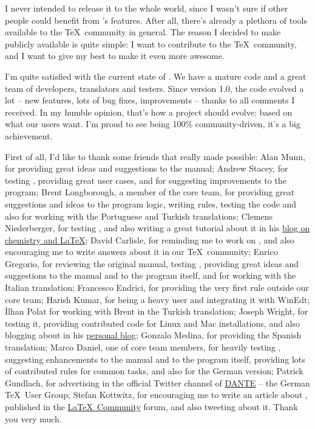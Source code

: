 \documentclass[a4paper,twoside,12pt]{memoir}
\begin{document}
I never intended to release it to the whole world, since I wasn't sure if other people could benefit from \arara's features. After all, there's already a plethora of tools available to the \TeX\ community in general. The reason I decided to make \arara publicly available is quite simple: I want to contribute to the \TeX\ community, and I want to give my best to make it even more awesome.

I'm quite satisfied with the current state of \arara. We have a mature code and a great team of developers, translators and testers. Since version 1.0, the code evolved a lot -- new features, lots of bug fixes, improvements -- thanks to all comments I received. In my humble opinion, that's how a project should evolve: based on what our users want. I'm proud to see \arara being 100\% community-driven, it's a big achievement.

First of all, I'd like to thank some friends that really made \arara possible: Alan Munn, for providing great ideas and suggestions to the manual; Andrew Stacey, for testing \arara, providing great user cases, and for suggesting improvements to the program; Brent Longborough, a member of the core team, for providing great suggestions and ideas to the program logic, writing rules, testing the code and also for working with the Portuguese and Turkish translations; Clemens Niederberger, for testing \arara, and also writing a great tutorial about it in his \href{http://www.mychemistry.eu/2012/06/arara-automate-latex-birds-music/}{blog on chemistry and \LaTeX}; David Carlisle, for reminding me to work on \arara, and also encouraging me to write answers about it in our \TeX\ community; Enrico Gregorio, for reviewing the original manual, testing \arara, providing great ideas and suggestions to the manual and to the program itself, and for working with the Italian translation; Francesco Endrici, for providing the very first \arara rule outside our core team; Harish Kumar, for being a heavy \arara user and integrating it with WinEdt; \.Ilhan Polat for working with Brent in the Turkish translation; Joseph Wright, for testing it, providing contributed code for Linux and Mac installations, and also blogging about \arara in his 
     \href{http://www.texdev.net}{personal blog}; Gonzalo Medina, for providing the Spanish translation; Marco Daniel, one of core team members, for heavily testing \arara, suggesting enhancements to the manual and to the program itself, providing lots of contributed rules for common tasks, and also for the German version; Patrick Gundlach, for advertising \arara in the official Twitter channel of \href{http://www.dante.de}{DANTE} -- the German \TeX\ User Group; Stefan Kottwitz, for encouraging me to write an article about \arara, published in   the \href{http://latex-community.org/know-how/435-gnuplot-arara}{\LaTeX\ Community} forum, and also tweeting about it. Thank you very much.
\end{document}
